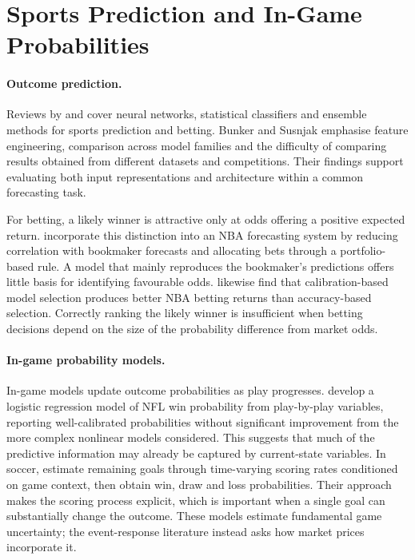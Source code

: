 \documentclass[12pt,a4paper,oneside]{report}
\begin{document}
\section{Sports Prediction and In-Game Probabilities}
\paragraph{Outcome prediction.}
Reviews by \citet{bunker2019machine} and \citet{galekwa2024systematic} cover neural
networks, statistical classifiers and ensemble methods for sports prediction and
betting. Bunker and Susnjak emphasise feature engineering, comparison across
model families and the difficulty of comparing results obtained from different
datasets and competitions. Their findings support evaluating both input
representations and architecture within a common forecasting task.

For betting, a likely winner is attractive only at odds offering a positive
expected return. \citet{hubacek2019exploiting} incorporate this distinction into
an NBA forecasting system by reducing correlation with bookmaker forecasts and
allocating bets through a portfolio-based rule. A model that mainly reproduces
the bookmaker's predictions offers little basis for identifying favourable odds.
\citet{walsh2024machine} likewise find that calibration-based model selection
produces better NBA betting returns than accuracy-based selection. Correctly
ranking the likely winner is insufficient when betting decisions depend on the
size of the probability difference from market odds.

\paragraph{In-game probability models.}
In-game models update outcome probabilities as play progresses.
\citet{pelechrinis2017iwinrnfl} develop a logistic regression model of NFL win
probability from play-by-play variables, reporting well-calibrated probabilities
without significant improvement from the more complex nonlinear models considered.
This suggests that much of the predictive information may already be captured by
current-state variables. In soccer, \citet{robberechts2021bayesian} estimate
remaining goals through time-varying scoring rates conditioned on game context,
then obtain win, draw and loss probabilities. Their approach makes the scoring
process explicit, which is important when a single goal can substantially change
the outcome. These models estimate fundamental game uncertainty; the
event-response literature instead asks how market prices incorporate it.
\end{document}
